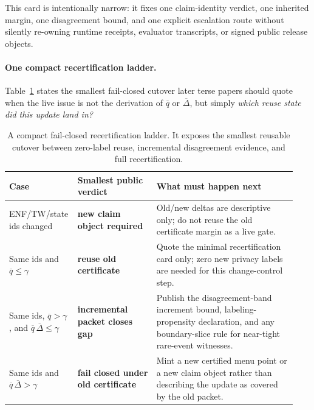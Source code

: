 \documentclass[11pt]{article}
\begin{document}
This card is intentionally narrow: it fixes one claim-identity verdict, one inherited margin, one disagreement bound, and one explicit escalation route without silently re-owning runtime receipts, evaluator transcripts, or signed public release objects.\cite{series:operationalB,series:eval1,series:releaseA}

\paragraph{One compact recertification ladder.}
Table~\ref{tab:recert-ladder} states the smallest fail-closed cutover later terse papers should quote when the live issue is not the derivation of $\overline q$ or $\overline{\Delta}$, but simply \emph{which reuse state did this update land in?}

\begin{table}[t]
\centering
\small
\begin{tabular}{@{}p{0.19\linewidth}p{0.27\linewidth}p{0.48\linewidth}@{}}
\toprule
Case & Smallest public verdict & What must happen next \\
\midrule
ENF/TW/state ids changed & \textbf{new claim object required} & Old/new deltas are descriptive only; do not reuse the old certificate margin as a live gate. \\
Same ids and $\overline q \le \gamma$ & \textbf{reuse old certificate} & Quote the minimal recertification card only; zero new privacy labels are needed for this change-control step. \\
Same ids, $\overline q > \gamma$, and $\overline q\,\overline{\Delta} \le \gamma$ & \textbf{incremental packet closes gap} & Publish the disagreement-band increment bound, labeling-propensity declaration, and any boundary-slice rule for near-tight rare-event witnesses. \\
Same ids and $\overline q\,\overline{\Delta} > \gamma$ & \textbf{fail closed under old certificate} & Mint a new certified menu point or a new claim object rather than describing the update as covered by the old packet. \\
\bottomrule
\end{tabular}
\caption{A compact fail-closed recertification ladder. It exposes the smallest reusable cutover between zero-label reuse, incremental disagreement evidence, and full recertification.}
\label{tab:recert-ladder}
\end{table}
\end{document}
